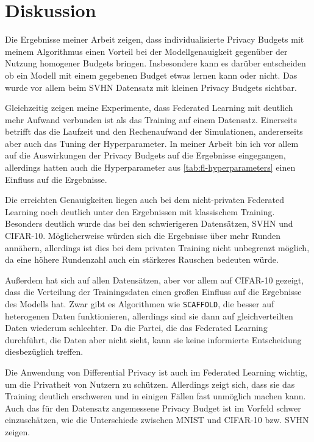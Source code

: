 \chapter{Diskussion}


Die Ergebnisse meiner Arbeit zeigen, dass individualisierte Privacy Budgets mit meinem Algorithmus einen Vorteil bei der Modellgenauigkeit gegenüber der Nutzung homogener Budgets bringen. Insbesondere kann es darüber entscheiden ob ein Modell mit einem gegebenen Budget etwas lernen kann oder nicht. Das wurde vor allem beim SVHN Datensatz mit kleinen Privacy Budgets sichtbar.

Gleichzeitig zeigen meine Experimente, dass Federated Learning mit deutlich mehr Aufwand verbunden ist als das Training auf einem Datensatz. Einerseits betrifft das die Laufzeit und den Rechenaufwand der Simulationen, andererseits aber auch das Tuning der Hyperparameter. In meiner Arbeit bin ich vor allem auf die Auswirkungen der Privacy Budgets auf die Ergebnisse eingegangen, allerdings hatten auch die Hyperparameter aus \autoref{tab:fl-hyperparameters} einen Einfluss auf die Ergebnisse.

Die erreichten Genauigkeiten liegen auch bei dem nicht-privaten Federated Learning noch deutlich unter den Ergebnissen mit klassischem Training. Besonders deutlich wurde das bei den schwierigeren Datensätzen, SVHN und CIFAR-10. Möglicherweise würden sich die Ergebnisse über mehr Runden annähern, allerdings ist dies bei dem privaten Training nicht unbegrenzt möglich, da eine höhere Rundenzahl auch ein stärkeres Rauschen bedeuten würde.

Außerdem hat sich auf allen Datensätzen, aber vor allem auf CIFAR-10 gezeigt, dass die Verteilung der Trainingsdaten einen großen Einfluss auf die Ergebnisse des Modells hat. Zwar gibt es Algorithmen wie \texttt{SCAFFOLD}, die besser auf heterogenen Daten funktionieren, allerdings sind sie dann auf gleichverteilten Daten wiederum schlechter. Da die Partei, die das Federated Learning durchführt, die Daten aber nicht sieht, kann sie keine informierte Entscheidung diesbezüglich treffen.

Die Anwendung von Differential Privacy ist auch im Federated Learning wichtig, um die Privatheit von Nutzern zu schützen. Allerdings zeigt sich, dass sie das Training deutlich erschweren und in einigen Fällen fast unmöglich machen kann. Auch das für den Datensatz angemessene Privacy Budget ist im Vorfeld schwer einzuschätzen, wie die Unterschiede zwischen MNIST und CIFAR-10 bzw. SVHN zeigen.


